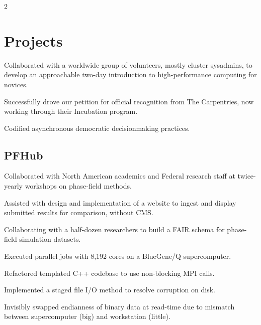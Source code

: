 \documentclass[letterpaper]{plushcv}
\begin{document}
\begin{paracol}{2}

\section{Projects}

\begin{tightemize}
\item Collaborated with a worldwide group of volunteers, mostly cluster
      sysadmins, to develop an approachable two-day introduction to
      high-performance computing for novices.
\item Successfully drove our petition for official recognition from The
      Carpentries, now working through their Incubation program.
\item Codified asynchronous democratic decisionmaking practices.
\end{tightemize}
\sectionsep{}

\subsection{PFHub}
\begin{tightemize}
\item Collaborated with North American academics and Federal research staff at
      twice-yearly workshops on phase-field methods.
\item Assisted with design and implementation of a website to ingest and
      display submitted results for comparison, without CMS.
\item Collaborating with a half-dozen researchers to build a FAIR schema
      for phase-field simulation datasets.
\end{tightemize}
\sectionsep{}

\begin{tightemize}
\item Executed parallel jobs with 8,192 cores on a BlueGene/Q supercomputer.
\item Refactored templated C++ codebase to use non-blocking MPI calls.
\item Implemented a staged file I/O method to resolve corruption on disk.
\item Invisibly swapped endianness of binary data at read-time due to mismatch
      between supercomputer (big) and workstation (little).
\end{tightemize}
\sectionsep{}


\end{paracol}
\end{document}
